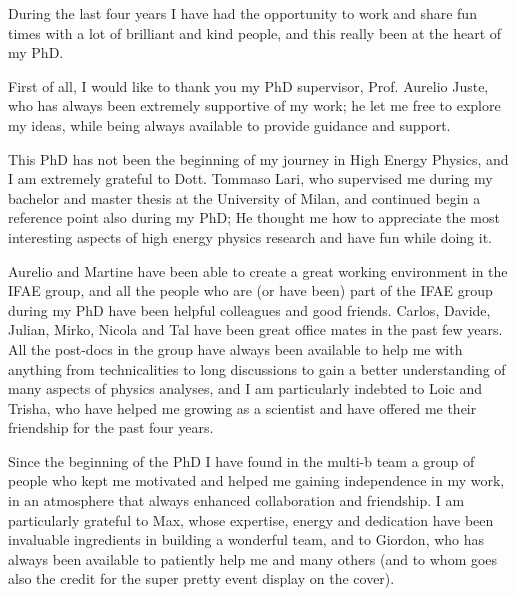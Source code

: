\par\bigskip 
\par\bigskip 

During the last four years I have had the opportunity to work and share fun times with a lot 
of brilliant and kind people, and this really been at the heart of my PhD. 

\par\bigskip 

First of all, I would like to thank you my PhD supervisor, Prof. Aurelio Juste, who has always been 
extremely supportive of my work; 
he let me free to explore my ideas, while being always available to provide guidance and support. 

\par\bigskip 

This PhD has not been the beginning of my journey in High Energy Physics, and I am extremely grateful to 
Dott. Tommaso Lari, who supervised me during my bachelor and master thesis at the University of Milan, 
and continued begin a reference point also during my PhD; 
He thought me how to appreciate the most interesting aspects of high energy physics research 
and have fun while doing it.  

\par\bigskip 
 
Aurelio and Martine have been able to create a great working environment in the IFAE group, and 
all the people who are (or have been) part of the IFAE group during my PhD have been helpful colleagues and 
good friends.  
Carlos, Davide, Julian, Mirko, Nicola and Tal have been great office mates in the past few years.  
All the post-docs in the group have always been available to help me with 
anything from technicalities to long discussions to gain a better understanding of many aspects of physics analyses, 
and I am particularly indebted to Loic and Trisha, who have helped me growing as a scientist and have offered me 
their friendship for the past four years. 

\par\bigskip

Since the beginning of the PhD I have found in the multi-b team a 
group of people who kept me motivated and helped me 
gaining independence in my work, 
in an atmosphere that always enhanced collaboration and friendship.  
I am particularly grateful to Max, whose expertise, energy and dedication have been 
invaluable ingredients in building a wonderful team, 
and to Giordon, who has always been available to patiently help me and many others (and 
to whom goes also the credit for the super pretty event display on the cover). 

